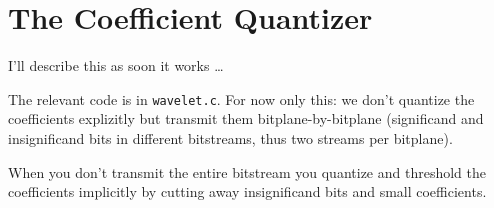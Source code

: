 
\section{ The Coefficient Quantizer }

I'll describe this as soon it works \dots

The relevant code is in \verb|wavelet.c|.
For now only this: we don't quantize the coefficients explizitly but transmit
them bitplane-by-bitplane (significand and insignificand bits in different 
bitstreams, thus two streams per bitplane).

When you don't transmit the entire bitstream you quantize and threshold the 
coefficients implicitly by cutting away insignificand bits and small 
coefficients.

